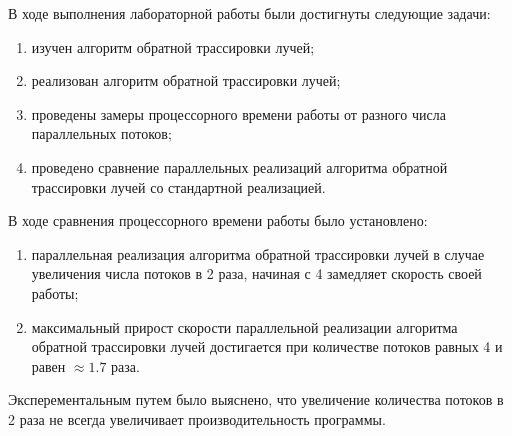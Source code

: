 \Conclusion
    В ходе выполнения лабораторной работы были достигнуты следующие задачи:
    \begin{enumerate}
        \item изучен алгоритм обратной трассировки лучей;
        \item реализован алгоритм обратной трассировки лучей;
        \item проведены замеры процессорного времени работы от разного числа параллельных потоков;
        \item проведено сравнение параллельных реализаций алгоритма обратной трассировки лучей со стандартной реализацией.
    \end{enumerate}

В ходе сравнения процессорного времени работы было установлено:
	\begin{enumerate}
	\item параллельная реализация алгоритма обратной трассировки лучей в случае увеличения числа потоков в 2 раза, начиная с 4 замедляет скорость своей работы;
	\item максимальный прирост скорости параллельной реализации алгоритма обратной трассировки лучей достигается при количестве потоков равных 4 и равен  $ \approx 1.7 $ раза.


        \end{enumerate}

Эксперементальным путем было выяснено, что увеличение количества потоков в 2 раза не всегда увеличивает производительность программы.

    

